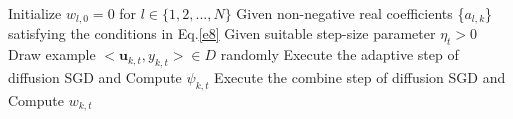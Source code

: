 

\begin{algorithm}
	\caption{ The ATC Diffusion SGD algorithm}\label{Alg_DSGD}
	\begin{algorithmic}
		\State Initialize $ w_{l,0}=0$ for $l\in\{1,2,...,N\}$
		\State Given non-negative real coefficients \{$a_{l,k}$\} satisfying the conditions in Eq.\ref{e8}
		\State Given suitable step-size parameter $\eta_t>0$
				\State Draw example $<\textbf{u}_{k,t},y_{k,t}>\in D$ randomly
				\State Execute the adaptive step of diffusion SGD and Compute $\psi_{k,t}$
				\State Execute the combine step of diffusion SGD and Compute $w_{k,t}$
			\EndFor
		\EndFor
	\end{algorithmic}
\end{algorithm}